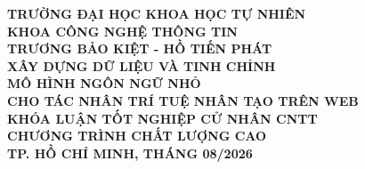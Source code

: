 \newcommand{\titlepageframe}{%
}

\begin{titlepage}
\titlepageframe

\begin{center}
{\bfseries TRƯỜNG ĐẠI HỌC KHOA HỌC TỰ NHIÊN\\
KHOA CÔNG NGHỆ THÔNG TIN}\\[2.5cm]

{\bfseries TRƯƠNG BẢO KIỆT - HỒ TIẾN PHÁT}\\[2.5cm]

{\large \bfseries \setlength{\baselineskip}{22pt}
XÂY DỰNG DỮ LIỆU VÀ TINH CHỈNH \\
MÔ HÌNH NGÔN NGỮ NHỎ \\
CHO TÁC NHÂN TRÍ TUỆ NHÂN TẠO TRÊN WEB}\\[4.5cm]

{\bfseries KHÓA LUẬN TỐT NGHIỆP CỬ NHÂN CNTT\\
CHƯƠNG TRÌNH CHẤT LƯỢNG CAO}\\[2.5cm]

\vspace*{\fill}
{\bfseries TP. HỒ CHÍ MINH, THÁNG 08/2026}\\[0.5cm]

\end{center}

\end{titlepage}

